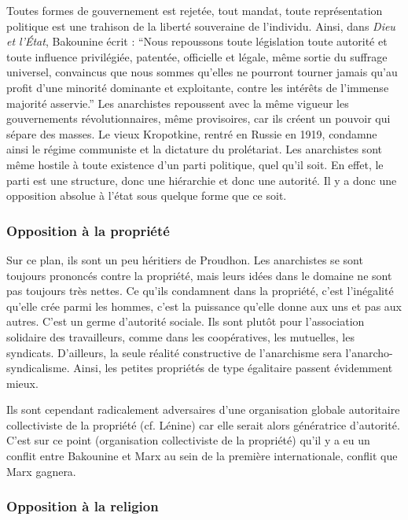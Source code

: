 \documentclass[12pt]{report}
\begin{document}
Toutes formes de gouvernement est rejetée, tout mandat, toute représentation politique est une trahison de la liberté souveraine de l'individu. Ainsi, dans \emph{Dieu et l'État}, Bakounine écrit : \enquote{Nous repoussons toute législation toute autorité et toute influence privilégiée, patentée, officielle et légale, même sortie du suffrage universel, convaincus que nous sommes qu’elles ne pourront tourner jamais qu’au profit d’une minorité dominante et exploitante, contre les intérêts de l’immense majorité asservie.}
Les anarchistes repoussent avec la même vigueur les gouvernements révolutionnaires, même provisoires, car ils créent un pouvoir qui sépare des masses. 
Le vieux Kropotkine, rentré en Russie en 1919, condamne ainsi le régime communiste et la dictature du prolétariat.
Les anarchistes sont même hostile à toute existence d’un parti politique, quel qu’il soit.
En effet, le parti est une structure, donc une hiérarchie et donc une autorité. 
Il y a donc une opposition absolue à l’état sous quelque forme que ce soit.

\subsubsection{Opposition à la propriété}

Sur ce plan, ils sont un peu héritiers de Proudhon.
Les anarchistes se sont toujours prononcés contre la propriété, mais leurs idées dans le domaine ne sont pas toujours très nettes.
Ce qu'ils condamnent dans la propriété, c'est l'inégalité qu'elle crée parmi les hommes, c'est la puissance qu'elle donne aux uns et pas aux autres.
C'est un germe d'autorité sociale.
Ils sont plutôt pour l'association solidaire des travailleurs, comme dans les coopératives, les mutuelles, les syndicats.
D'ailleurs, la seule réalité constructive de l'anarchisme sera l'anarcho-syndicalisme.
Ainsi, les petites propriétés de type égalitaire passent évidemment mieux.

Ils sont cependant radicalement adversaires d'une organisation globale autoritaire collectiviste de la propriété (cf. Lénine) car elle serait alors génératrice d’autorité.
C’est sur ce point (organisation collectiviste de la propriété) qu’il y a eu un conflit entre Bakounine et Marx au sein de la première internationale, conflit que Marx gagnera.

\subsubsection{Opposition à la religion}
\end{document}
